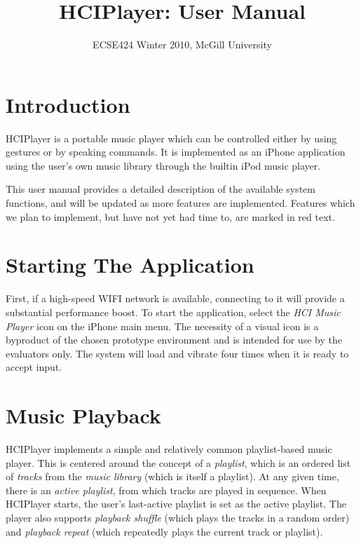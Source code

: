 \documentclass[12pt,letterpaper]{article}
\begin{document}
\title{HCIPlayer: User Manual}
\author{ECSE424 Winter 2010, McGill University}
\renewcommand{\today}{Updated: Monday, March 8th, 2010}
\maketitle

\section{Introduction}

HCIPlayer is a portable music player which can be controlled either by using gestures or by speaking commands. It is implemented as an iPhone application using the user's own music library through the builtin iPod music player.

This user manual provides a detailed description of the available system functions, and will be updated as more features are implemented. Features which we plan to implement, but have not yet had time to, are {\color{red} marked in red text}.

\section{Starting The Application}
First, if a high-speed WIFI network is available, connecting to it will provide a substantial performance boost. To start the application, select the \emph{HCI Music Player} icon on the iPhone main menu. The necessity of a visual icon is a byproduct of the chosen prototype environment and is intended for use by the evaluators only. The system will load and vibrate four times when it is ready to accept input.

\section{Music Playback}

HCIPlayer implements a simple and relatively common playlist-based music player. This is centered around the concept of a \emph{playlist}, which is an ordered list of \emph{tracks} from the \emph{music library} (which is itself a playlist). At any given time, there is an \emph{active playlist}, from which tracks are played in sequence. When HCIPlayer starts, the user's last-active playlist is set as the active playlist. The player also supports \emph{playback shuffle} (which plays the tracks in a random order) and \emph{playback repeat} (which repeatedly plays the current track or playlist).
\end{document}
